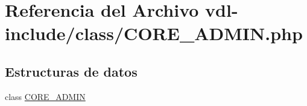 \hypertarget{CORE__ADMIN_8php}{\section{Referencia del Archivo vdl-\/include/class/\-C\-O\-R\-E\-\_\-\-A\-D\-M\-I\-N.php}
\label{CORE__ADMIN_8php}
}
\subsection*{Estructuras de datos}
\begin{DoxyCompactItemize}
\item 
class \hyperlink{classCORE__ADMIN}{C\-O\-R\-E\-\_\-\-A\-D\-M\-I\-N}
\end{DoxyCompactItemize}
